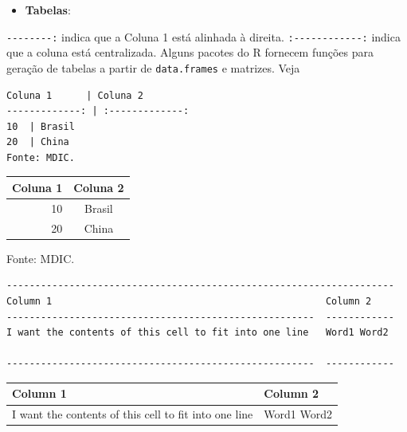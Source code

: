 \documentclass[]{book}
\providecommand{\tightlist}{%
  \setlength{\itemsep}{0pt}\setlength{\parskip}{0pt}}
\begin{document}
\begin{itemize}
\tightlist
\item
  \textbf{Tabelas}:
\end{itemize}

\texttt{-\/-\/-\/-\/-\/-\/-\/-:} indica que a Coluna 1 está alinhada à
direita. \texttt{:-\/-\/-\/-\/-\/-\/-\/-\/-\/-\/-\/-:} indica que a
coluna está centralizada. Alguns pacotes do R fornecem funções para
geração de tabelas a partir de \texttt{data.frames} e matrizes. Veja

\begin{verbatim}
Coluna 1      | Coluna 2
-------------: | :-------------:
10  | Brasil
20  | China
Fonte: MDIC.
\end{verbatim}

\begin{longtable}[]{@{}rc@{}}
\toprule
Coluna 1 & Coluna 2\tabularnewline
\midrule
\endhead
10 & Brasil\tabularnewline
20 & China\tabularnewline
\bottomrule
\end{longtable}

Fonte: MDIC.

\begin{verbatim}
--------------------------------------------------------------------
Column 1                                                Column 2
------------------------------------------------------  ------------
I want the contents of this cell to fit into one line   Word1 Word2

------------------------------------------------------  ------------
\end{verbatim}

\begin{longtable}[]{@{}ll@{}}
\toprule
\begin{minipage}[b]{0.73\columnwidth}\raggedright\strut
Column 1\strut
\end{minipage} & \begin{minipage}[b]{0.16\columnwidth}\raggedright\strut
Column 2\strut
\end{minipage}\tabularnewline
\midrule
\endhead
\begin{minipage}[t]{0.73\columnwidth}\raggedright\strut
I want the contents of this cell to fit into one line\strut
\end{minipage} & \begin{minipage}[t]{0.16\columnwidth}\raggedright\strut
Word1 Word2\strut
\end{minipage}\tabularnewline
\bottomrule
\end{longtable}
\end{document}

